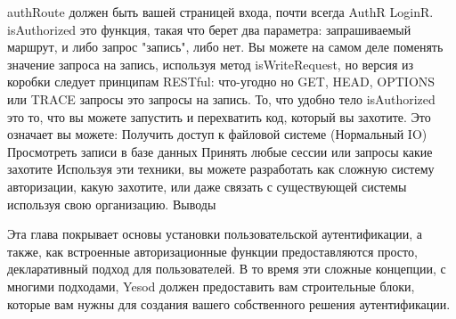 authRoute должен быть вашей страницей входа, почти всегда AuthR LoginR. isAuthorized это функция, такая что берет два параметра: запрашиваемый маршрут, и либо запрос "запись", либо нет. Вы можете на самом деле поменять значение запроса на запись, используя метод isWriteRequest, но версия из коробки следует принципам RESTful: что-угодно но GET, HEAD, OPTIONS или TRACE запросы это запросы на запись.
То, что удобно тело isAuthorized это то, что вы можете запустить и перехватить код, который вы захотите. Это означает вы можете:
Получить доступ к файловой системе (Нормальный IO)
Просмотреть записи в базе данных
Принять любые сессии или запросы какие захотите
Используя эти техники, вы можете разработать как сложную систему авторизации, какую захотите, или даже связать с существующей системы используя свою организацию.
Выводы

Эта глава покрывает основы установки пользовательской аутентификации, а также, как встроенные авторизационные функции предоставляются просто, декларативный подход для пользователей. В то время эти сложные концепции, с многими подходами, Yesod должен предоставить вам строительные блоки, которые вам нужны для создания вашего собственного решения аутентификации.
